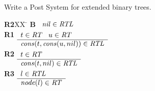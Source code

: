 \documentclass[]{exam}
\begin{document}
\begin{questions}
\begin{solution}
\end{solution}
\question Write a Post System for extended binary trees.
\begin{solution}
\begin{tabbing}
{\bf R2}XX \=  \kill
{\bf B} \>
        \(\begin{array}[t]{l}
        \mbox{\it nil\/}\in\mbox{\it RTL\/}
        \end{array}\) \\[2ex]
{\bf R1} \>
        \(\begin{array}[t]{l}
        t\in\mbox{\it RT\/}\;\;\;u\in\mbox{\it RT\/} \\
        \hline
        \mbox{\it cons\/}(t,\mbox{\it cons\/}(u,nil))\in\mbox{\it RTL\/}
        \end{array}\) \\[2ex]
{\bf R2} \>
        \(\begin{array}[t]{l}
        t\in\mbox{\it RT\/} \\
        \hline
        \mbox{\it cons\/}(t,nil)\in\mbox{\it RTL\/}
        \end{array}\) \\[2ex]
{\bf R3} \>
        \(\begin{array}[t]{l}
        l\in\mbox{\it RTL\/} \\
        \hline
        \mbox{\it node\/}(l)\in\mbox{\it RT\/}
        \end{array}\)

\end{tabbing}

\end{solution}


\end{questions}
\end{document}
